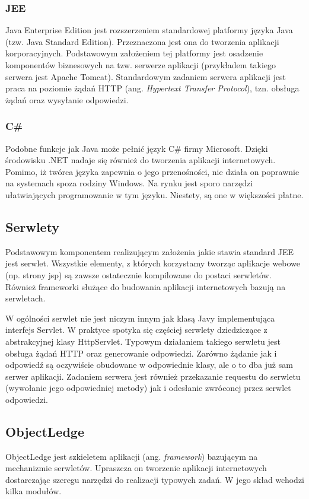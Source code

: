 \subsubsection{JEE}
Java Enterprise Edition jest rozszerzeniem standardowej platformy języka Java (tzw. Java Standard Edition). Przeznaczona jest ona do tworzenia aplikacji korporacyjnych. Podstawowym założeniem tej platformy jest osadzenie komponentów biznesowych na tzw. serwerze aplikacji (przykładem takiego serwera jest Apache Tomcat). Standardowym zadaniem serwera aplikacji jest praca na poziomie żądań HTTP (ang. \textit{Hypertext Transfer Protocol}), tzn. obsługa żądań oraz wysyłanie odpowiedzi.

\subsubsection{C\#}
Podobne funkcje jak Java może pełnić język C\# firmy Microsoft. Dzięki środowisku .NET nadaje się również do tworzenia aplikacji internetowych. Pomimo, iż twórca języka zapewnia o jego przenośności, nie działa on poprawnie na systemach spoza rodziny Windows. Na rynku jest sporo narzędzi ułatwiających programowanie w tym języku. Niestety, są one w większości płatne.

\subsection[Serwlety][Serwlety]{Serwlety}
Podstawowym komponentem realizującym założenia jakie stawia standard JEE jest serwlet. Wszystkie elementy, z których korzystamy tworząc aplikacje webowe (np. strony jsp) są zawsze ostatecznie kompilowane do postaci serwletów. Również frameworki służące do budowania aplikacji internetowych bazują na serwletach.

W ogólności serwlet nie jest niczym innym jak klasą Javy implementująca interfejs Servlet. W praktyce spotyka się częściej serwlety dziedziczące z abstrakcyjnej klasy HttpServlet. Typowym działaniem takiego serwletu jest obsługa żądań HTTP oraz generowanie odpowiedzi. Zarówno żądanie jak i odpowiedź są oczywiście obudowane w odpowiednie klasy, ale o to dba już sam serwer aplikacji. Zadaniem serwera jest również przekazanie requestu do serwletu (wywołanie jego odpowiedniej metody) jak i odesłanie zwróconej przez serwlet odpowiedzi.

\subsection[ObjectLedge][ObjectLedge]{ObjectLedge}
ObjectLedge jest szkieletem aplikacji (ang. \textit{framework}) bazującym na mechanizmie serwletów. Upraszcza on tworzenie aplikacji internetowych dostarczając szeregu narzędzi do realizacji typowych zadań. W jego skład wchodzi kilka modułów.

